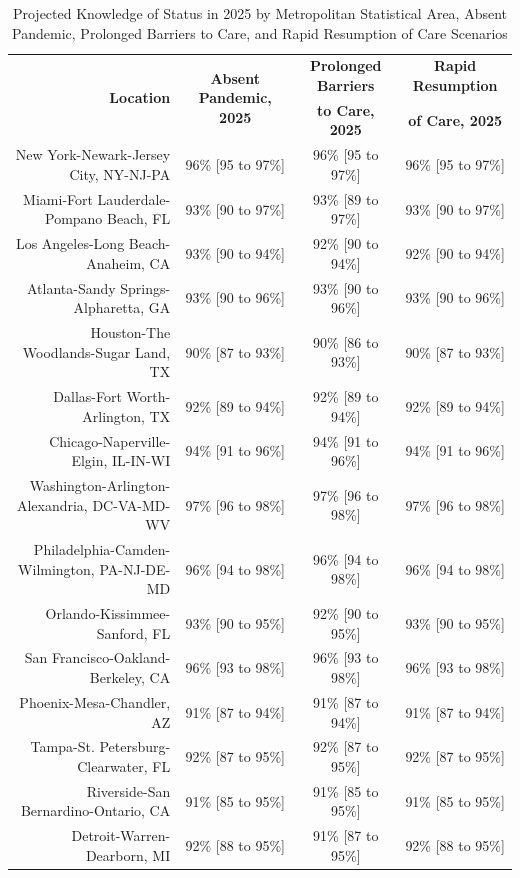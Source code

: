 \documentclass{article}
\begin{document}
\begin{table}[H]
	\caption{Projected Knowledge of Status in 2025 by Metropolitan Statistical Area, Absent Pandemic, Prolonged Barriers to Care, and Rapid Resumption of Care Scenarios}
	\footnotesize
	\begin{tabular}{|r|c|c|c|}
		\hline
		\multirow{2}{*}{\textbf{Location}} & \multirow{2}{*}{\textbf{Absent Pandemic, 2025}} & \textbf{Prolonged Barriers} & \textbf{Rapid Resumption}\\
		&  & \textbf{to Care, 2025} & \textbf{of Care, 2025}\\
		\hline\hline
		New York-Newark-Jersey City, NY-NJ-PA & 96\% [95 to 97\%] & 96\% [95 to 97\%] & 96\% [95 to 97\%]\\
		Miami-Fort Lauderdale-Pompano Beach, FL & 93\% [90 to 97\%] & 93\% [89 to 97\%] & 93\% [90 to 97\%]\\
		Los Angeles-Long Beach-Anaheim, CA & 93\% [90 to 94\%] & 92\% [90 to 94\%] & 92\% [90 to 94\%]\\
		Atlanta-Sandy Springs-Alpharetta, GA & 93\% [90 to 96\%] & 93\% [90 to 96\%] & 93\% [90 to 96\%]\\
		Houston-The Woodlands-Sugar Land, TX & 90\% [87 to 93\%] & 90\% [86 to 93\%] & 90\% [87 to 93\%]\\
		Dallas-Fort Worth-Arlington, TX & 92\% [89 to 94\%] & 92\% [89 to 94\%] & 92\% [89 to 94\%]\\
		Chicago-Naperville-Elgin, IL-IN-WI & 94\% [91 to 96\%] & 94\% [91 to 96\%] & 94\% [91 to 96\%]\\
		Washington-Arlington-Alexandria, DC-VA-MD-WV & 97\% [96 to 98\%] & 97\% [96 to 98\%] & 97\% [96 to 98\%]\\
		Philadelphia-Camden-Wilmington, PA-NJ-DE-MD & 96\% [94 to 98\%] & 96\% [94 to 98\%] & 96\% [94 to 98\%]\\
		Orlando-Kissimmee-Sanford, FL & 93\% [90 to 95\%] & 92\% [90 to 95\%] & 93\% [90 to 95\%]\\
		San Francisco-Oakland-Berkeley, CA & 96\% [93 to 98\%] & 96\% [93 to 98\%] & 96\% [93 to 98\%]\\
		Phoenix-Mesa-Chandler, AZ & 91\% [87 to 94\%] & 91\% [87 to 94\%] & 91\% [87 to 94\%]\\
		Tampa-St. Petersburg-Clearwater, FL & 92\% [87 to 95\%] & 92\% [87 to 95\%] & 92\% [87 to 95\%]\\
		Riverside-San Bernardino-Ontario, CA & 91\% [85 to 95\%] & 91\% [85 to 95\%] & 91\% [85 to 95\%]\\
		Detroit-Warren-Dearborn, MI & 92\% [88 to 95\%] & 91\% [87 to 95\%] & 92\% [88 to 95\%]\\

\end{tabular}
\end{table}
\end{document}
